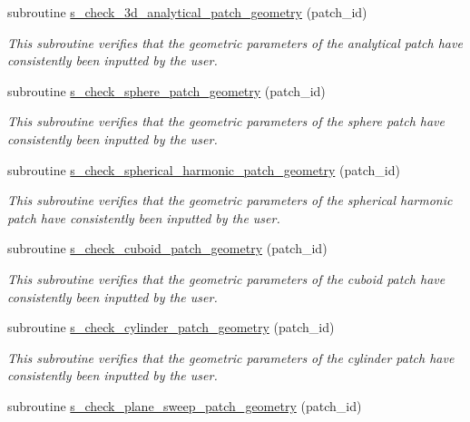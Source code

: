 \begin{DoxyCompactItemize}
subroutine \hyperlink{namespacem__start__up_a936948a39ac13e74203588cae06b325f}{s\+\_\+check\+\_\+3d\+\_\+analytical\+\_\+patch\+\_\+geometry} (patch\+\_\+id)
\begin{DoxyCompactList}\small\item\em This subroutine verifies that the geometric parameters of the analytical patch have consistently been inputted by the user. \end{DoxyCompactList}\item 
subroutine \hyperlink{namespacem__start__up_a3bc334d434726c8cdba2f5d611ec4d42}{s\+\_\+check\+\_\+sphere\+\_\+patch\+\_\+geometry} (patch\+\_\+id)
\begin{DoxyCompactList}\small\item\em This subroutine verifies that the geometric parameters of the sphere patch have consistently been inputted by the user. \end{DoxyCompactList}\item 
subroutine \hyperlink{namespacem__start__up_a59bfdd1a0d03041d57f7f9e7e1a38a97}{s\+\_\+check\+\_\+spherical\+\_\+harmonic\+\_\+patch\+\_\+geometry} (patch\+\_\+id)
\begin{DoxyCompactList}\small\item\em This subroutine verifies that the geometric parameters of the spherical harmonic patch have consistently been inputted by the user. \end{DoxyCompactList}\item 
subroutine \hyperlink{namespacem__start__up_ac9af27b20bc2249e7c015c76061b5515}{s\+\_\+check\+\_\+cuboid\+\_\+patch\+\_\+geometry} (patch\+\_\+id)
\begin{DoxyCompactList}\small\item\em This subroutine verifies that the geometric parameters of the cuboid patch have consistently been inputted by the user. \end{DoxyCompactList}\item 
subroutine \hyperlink{namespacem__start__up_ad6c503541113565dcac0b49b11ff3afb}{s\+\_\+check\+\_\+cylinder\+\_\+patch\+\_\+geometry} (patch\+\_\+id)
\begin{DoxyCompactList}\small\item\em This subroutine verifies that the geometric parameters of the cylinder patch have consistently been inputted by the user. \end{DoxyCompactList}\item 
subroutine \hyperlink{namespacem__start__up_aae294c405210613a2466358f3af3fd90}{s\+\_\+check\+\_\+plane\+\_\+sweep\+\_\+patch\+\_\+geometry} (patch\+\_\+id)

\end{DoxyCompactItemize}

